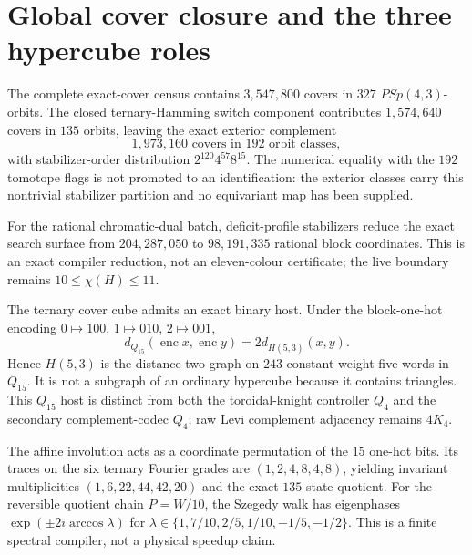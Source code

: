 \section{Global cover closure and the three hypercube roles}
\label{sec:global-cover-quantum-hypercube}
The complete exact-cover census contains $3{,}547{,}800$ covers in $327$ $PSp(4,3)$-orbits.  The closed ternary-Hamming switch component contributes $1{,}574{,}640$ covers in $135$ orbits, leaving the exact exterior complement
\[
  1{,}973{,}160\text{ covers in }192\text{ orbit classes},
\]
with stabilizer-order distribution $2^{120}4^{57}8^{15}$.  The numerical equality with the $192$ tomotope flags is not promoted to an identification: the exterior classes carry this nontrivial stabilizer partition and no equivariant map has been supplied.

For the rational chromatic-dual batch, deficit-profile stabilizers reduce the exact search surface from $204{,}287{,}050$ to $98{,}191{,}335$ rational block coordinates.  This is an exact compiler reduction, not an eleven-colour certificate; the live boundary remains $10\leq\chi(H)\leq11$.

The ternary cover cube admits an exact binary host.  Under the block-one-hot encoding $0\mapsto100$, $1\mapsto010$, $2\mapsto001$,
\[
 d_{Q_{15}}(\operatorname{enc}x,\operatorname{enc}y)=2d_{H(5,3)}(x,y).
\]
Hence $H(5,3)$ is the distance-two graph on $243$ constant-weight-five words in $Q_{15}$.  It is not a subgraph of an ordinary hypercube because it contains triangles.  This $Q_{15}$ host is distinct from both the toroidal-knight controller $Q_4$ and the secondary complement-codec $Q_4$; raw Levi complement adjacency remains $4K_4$.

The affine involution acts as a coordinate permutation of the $15$ one-hot bits.  Its traces on the six ternary Fourier grades are $(1,2,4,8,4,8)$, yielding invariant multiplicities $(1,6,22,44,42,20)$ and the exact $135$-state quotient.  For the reversible quotient chain $P=W/10$, the Szegedy walk has eigenphases $\exp(\pm2i\arccos\lambda)$ for $\lambda\in\{1,7/10,2/5,1/10,-1/5,-1/2\}$.  This is a finite spectral compiler, not a physical speedup claim.
